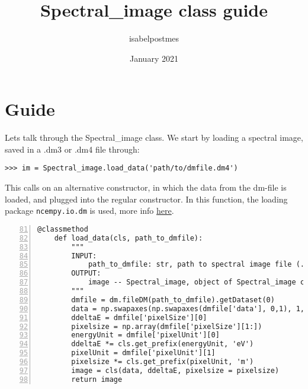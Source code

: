 \documentclass{article}
\title{Spectral\_image class guide}
\author{isabelpostmes }
\date{January 2021}
\begin{document}
\maketitle

\section{Guide}




%

%




Lets talk through the Spectral\_image class. We start by loading a spectral image, saved in a .dm3 or .dm4 file through:

\begin{lstlisting}
>>> im = Spectral_image.load_data('path/to/dmfile.dm4')
\end{lstlisting}

This calls on an alternative constructor, in which the data from the dm-file is loaded, and plugged into the regular constructor. In this function, the loading package \verb|ncempy.io.dm| is used,  more info \href{https://pypi.org/project/ncempy/}{here}. 



\begin{lstlisting}[numbers=left, firstnumber=81]
    @classmethod
    def load_data(cls, path_to_dmfile):
        """
        INPUT: 
            path_to_dmfile: str, path to spectral image file (.dm3 or .dm4 extension)
        OUTPUT:
            image -- Spectral_image, object of Spectral_image class containing the data of the dm-file
        """
        dmfile = dm.fileDM(path_to_dmfile).getDataset(0)
        data = np.swapaxes(np.swapaxes(dmfile['data'], 0,1), 1,2)
        ddeltaE = dmfile['pixelSize'][0]
        pixelsize = np.array(dmfile['pixelSize'][1:])
        energyUnit = dmfile['pixelUnit'][0]
        ddeltaE *= cls.get_prefix(energyUnit, 'eV')
        pixelUnit = dmfile['pixelUnit'][1]
        pixelsize *= cls.get_prefix(pixelUnit, 'm')
        image = cls(data, ddeltaE, pixelsize = pixelsize)
        return image
\end{lstlisting}
\end{document}
